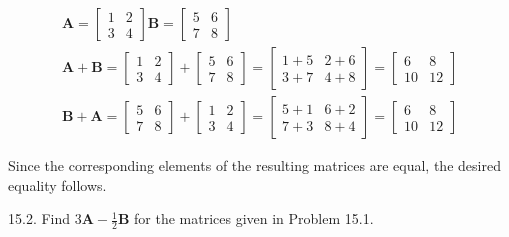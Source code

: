 \documentclass[10pt]{article}
\begin{document}
$$
\begin{gathered}
\mathbf{A}=\left[\begin{array}{ll}
1 & 2 \\
3 & 4
\end{array}\right] \mathbf{B}=\left[\begin{array}{ll}
5 & 6 \\
7 & 8
\end{array}\right] \\
\mathbf{A}+\mathbf{B}=\left[\begin{array}{ll}
1 & 2 \\
3 & 4
\end{array}\right]+\left[\begin{array}{ll}
5 & 6 \\
7 & 8
\end{array}\right]=\left[\begin{array}{ll}
1+5 & 2+6 \\
3+7 & 4+8
\end{array}\right]=\left[\begin{array}{rr}
6 & 8 \\
10 & 12
\end{array}\right] \\
\mathbf{B}+\mathbf{A}=\left[\begin{array}{ll}
5 & 6 \\
7 & 8
\end{array}\right]+\left[\begin{array}{ll}
1 & 2 \\
3 & 4
\end{array}\right]=\left[\begin{array}{ll}
5+1 & 6+2 \\
7+3 & 8+4
\end{array}\right]=\left[\begin{array}{rr}
6 & 8 \\
10 & 12
\end{array}\right]
\end{gathered}
$$

Since the corresponding elements of the resulting matrices are equal, the desired equality follows.

15.2. Find $3 \mathbf{A}-\frac{1}{2} \mathbf{B}$ for the matrices given in Problem 15.1.
\end{document}
